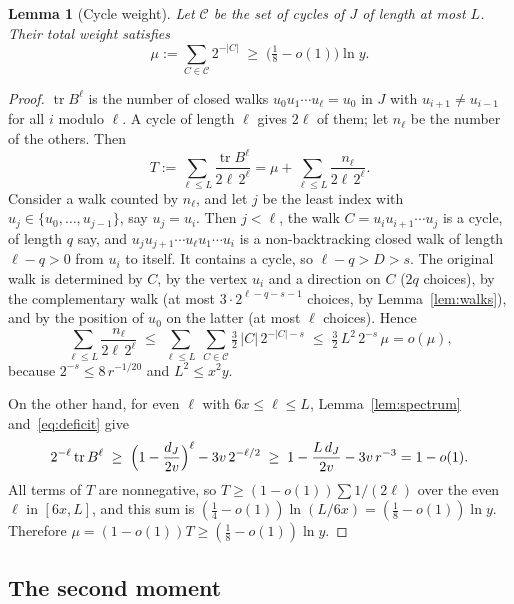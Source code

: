 \documentclass[11pt]{article}
\newtheorem{lemma}[theorem]{Lemma}
\theoremstyle{definition}
\theoremstyle{remark}
\newcommand{\tr}{\operatorname{tr}}
\numberwithin{equation}{section}
\begin{document}
\begin{lemma}[Cycle weight]\label{lem:weight}
Let $\mathcal{C}$ be the set of cycles of $J$ of length at most $L$. Their total weight satisfies
\[
  \mu:=\sum_{C\in\mathcal{C}}2^{-|C|}\;\ge\;\bigl(\tfrac18-o(1)\bigr)\ln y .
\]
\end{lemma}

\begin{proof}
$\tr B^{\ell}$ is the number of closed walks $u_0u_1\cdots u_\ell=u_0$ in $J$ with
$u_{i+1}\ne u_{i-1}$ for all $i$ modulo $\ell$. A cycle of length $\ell$ gives $2\ell$ of them; let
$n_\ell$ be the number of the others. Then
\[
  T:=\sum_{\ell\le L}\frac{\tr B^{\ell}}{2\ell\,2^{\ell}}=\mu+\sum_{\ell\le L}\frac{n_\ell}{2\ell\,2^{\ell}} .
\]
Consider a walk counted by $n_\ell$, and let $j$ be the least index with
$u_j\in\{u_0,\dots,u_{j-1}\}$, say $u_j=u_i$. Then $j<\ell$, the walk $C=u_iu_{i+1}\cdots u_j$ is a
cycle, of length $q$ say, and $u_ju_{j+1}\cdots u_\ell u_1\cdots u_i$ is a non-backtracking closed
walk of length $\ell-q>0$ from $u_i$ to itself. It contains a cycle, so $\ell-q>D>s$. The original
walk is determined by $C$, by the vertex $u_i$ and a direction on $C$ ($2q$ choices), by the
complementary walk (at most $3\cdot2^{\ell-q-s-1}$ choices, by Lemma~\ref{lem:walks}), and by the
position of $u_0$ on the latter (at most $\ell$ choices). Hence
\[
  \sum_{\ell\le L}\frac{n_\ell}{2\ell\,2^{\ell}}
  \;\le\;\sum_{\ell\le L}\ \sum_{C\in\mathcal{C}}\tfrac32\,|C|\,2^{-|C|-s}
  \;\le\;\tfrac32\,L^{2}\,2^{-s}\,\mu=o(\mu),
\]
because $2^{-s}\le8\,r^{-1/20}$ and $L^{2}\le x^{2}y$.

On the other hand, for even $\ell$ with $6x\le\ell\le L$, Lemma~\ref{lem:spectrum}
and~\eqref{eq:deficit} give
\[
  2^{-\ell}\tr B^{\ell}\;\ge\;\Bigl(1-\frac{d_J}{2v}\Bigr)^{\ell}-3v\,2^{-\ell/2}
  \;\ge\;1-\frac{L\,d_J}{2v}-3v\,r^{-3}=1-o(1).
\]
All terms of $T$ are nonnegative, so $T\ge(1-o(1))\sum1/(2\ell)$ over the even $\ell$ in $[6x,L]$,
and this sum is $(\frac14-o(1))\ln(L/6x)=(\frac18-o(1))\ln y$. Therefore
$\mu=(1-o(1))T\ge(\frac18-o(1))\ln y$.
\end{proof}

\subsection{The second moment}
\end{document}
